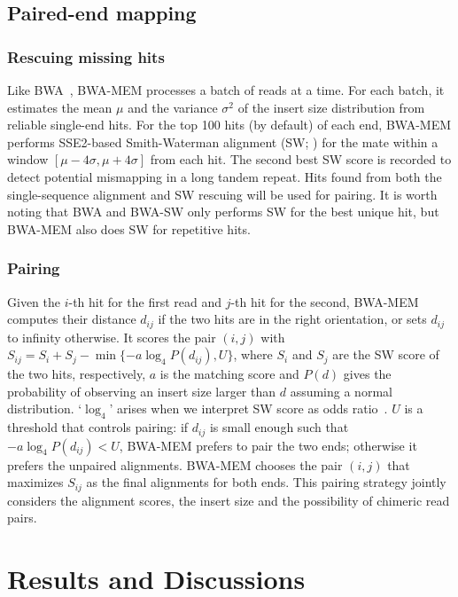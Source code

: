 \documentclass{bioinfo}
\begin{document}
\begin{methods}
\subsection{Paired-end mapping}

\subsubsection{Rescuing missing hits}
Like BWA~\citep{Li:2009uq}, BWA-MEM processes a batch of reads at a time.
For each batch, it estimates the mean $\mu$ and the variance $\sigma^2$
of the insert size distribution from reliable single-end hits. For the
top 100 hits (by default) of each end, BWA-MEM performs SSE2-based
Smith-Waterman alignment (SW; \citealt{Farrar:2007hs}) for the mate within a
window $[\mu-4\sigma,\mu+4\sigma]$ from each hit. The second best SW score is
recorded to detect potential mismapping in a long tandem repeat. Hits found
from both the single-sequence alignment and SW rescuing will be used for
pairing. It is worth noting that BWA and BWA-SW only performs SW for the
best unique hit, but BWA-MEM also does SW for repetitive hits.

\subsubsection{Pairing} Given the $i$-th hit for the first read and $j$-th hit
for the second, BWA-MEM computes their distance $d_{ij}$ if the two hits are in
the right orientation, or sets $d_{ij}$ to infinity otherwise. It scores the
pair $(i,j)$ with $S_{ij}=S_i+S_j-\min\{-a\log_4 P(d_{ij}),U\}$, where $S_i$
and $S_j$ are the SW score of the two hits, respectively, $a$ is the matching
score and $P(d)$ gives the probability of observing an insert size larger than
$d$ assuming a normal distribution. `$\log_4$' arises when we interpret SW
score as odds ratio~\citep{Durbin:1998uq}. $U$ is a threshold that controls
pairing: if $d_{ij}$ is small enough such that $-a\log_4 P(d_{ij})<U$, BWA-MEM
prefers to pair the two ends; otherwise it prefers the unpaired alignments.
BWA-MEM chooses the pair $(i,j)$ that maximizes $S_{ij}$ as the final
alignments for both ends.  This pairing strategy jointly considers the
alignment scores, the insert size and the possibility of chimeric read pairs.

\end{methods}

\section{Results and Discussions}
\end{document}
